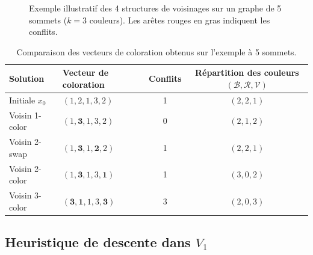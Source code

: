 \documentclass{article}
\begin{document}
\begin{figure}[H]
\caption{Exemple illustratif des 4 structures de voisinages sur un graphe de 5 sommets ($k=3$ couleurs). Les arêtes rouges en gras indiquent les conflits.}
\label{fig:exemple_voisinages}
\end{figure}

\begin{table}[H]
\centering
\small
\begin{tabular}{llcc}
\toprule
\textbf{Solution} & \textbf{Vecteur de coloration} & \textbf{Conflits} & \textbf{Répartition des couleurs} $(\mathcal{B}, \mathcal{R}, \mathcal{V})$ \\
\midrule
Initiale $x_0$       & $(1, 2, 1, 3, 2)$ & 1 & $(2, 2, 1)$ \\
Voisin 1-color       & $(1, \mathbf{3}, 1, 3, 2)$ & 0 & $(2, 1, 2)$ \\
Voisin 2-swap        & $(1, \mathbf{3}, 1, \mathbf{2}, 2)$ & 1 & $(2, 2, 1)$ \\
Voisin 2-color       & $(1, \mathbf{3}, 1, 3, \mathbf{1})$ & 1 & $(3, 0, 2)$ \\
Voisin 3-color       & $(\mathbf{3}, \mathbf{1}, 1, 3, \mathbf{3})$ & 3 & $(2, 0, 3)$ \\
\bottomrule
\end{tabular}
\caption{Comparaison des vecteurs de coloration obtenus sur l'exemple à 5 sommets.}
\label{tab:comparaison_voisinages}
\end{table}

\subsection{Heuristique de descente dans $V_1$}
\end{document}
